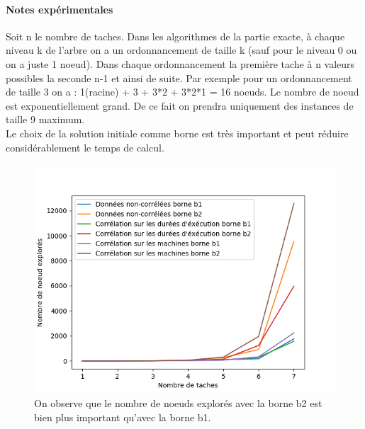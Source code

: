 \documentclass[a4paper, 10pt]{article}
\begin{document}
		\paragraph{Notes expérimentales}{
                  Soit n le nombre de taches.
                  Dans les algorithmes de la partie exacte, à chaque niveau k de l'arbre on a un ordonnancement de taille k (sauf pour le niveau 0 ou on a juste 1 noeud). Dans chaque ordonnancement la première tache à n valeurs possibles la seconde n-1 et ainsi de suite. Par exemple pour un ordonnancement de taille 3 on a : 1(racine) + 3 + 3*2 + 3*2*1 = 16 noeuds. Le nombre de noeud est exponentiellement grand. De ce fait on prendra uniquement des instances de taille 9 maximum. \\
                  Le choix de la solution initiale comme borne est très important et peut réduire considérablement le temps de calcul.
                }

                \paragraph{}{
                \begin{figure}[h]
			\centering
			\includegraphics[width=0.85\linewidth]{graphes/b2.png}
			\caption{On observe que le nombre de noeuds explorés avec la borne b2 est bien plus important qu'avec la borne b1.}
			\label{fig:b2}
		\end{figure}
		}
\end{document}
